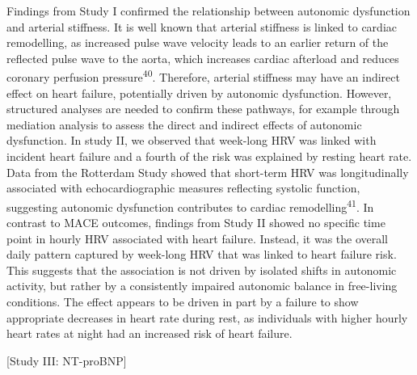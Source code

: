 \documentclass[
  a4paper,
  headsepline=true,
  open=any]{scrbook}
\begin{document}
Findings from Study I confirmed the relationship between autonomic
dysfunction and arterial stiffness. It is well known that arterial
stiffness is linked to cardiac remodelling, as increased pulse wave
velocity leads to an earlier return of the reflected pulse wave to the
aorta, which increases cardiac afterload and reduces coronary perfusion
pressure\textsuperscript{40}. Therefore, arterial stiffness may have an
indirect effect on heart failure, potentially driven by autonomic
dysfunction. However, structured analyses are needed to confirm these
pathways, for example through mediation analysis to assess the direct
and indirect effects of autonomic dysfunction. In study II, we observed
that week-long HRV was linked with incident heart failure and a fourth
of the risk was explained by resting heart rate. Data from the Rotterdam
Study showed that short-term HRV was longitudinally associated with
echocardiographic measures reflecting systolic function, suggesting
autonomic dysfunction contributes to cardiac
remodelling\textsuperscript{41}. In contrast to MACE outcomes, findings
from Study II showed no specific time point in hourly HRV associated
with heart failure. Instead, it was the overall daily pattern captured
by week-long HRV that was linked to heart failure risk. This suggests
that the association is not driven by isolated shifts in autonomic
activity, but rather by a consistently impaired autonomic balance in
free-living conditions. The effect appears to be driven in part by a
failure to show appropriate decreases in heart rate during rest, as
individuals with higher hourly heart rates at night had an increased
risk of heart failure.

{[}Study III: NT-proBNP{]}
\end{document}
